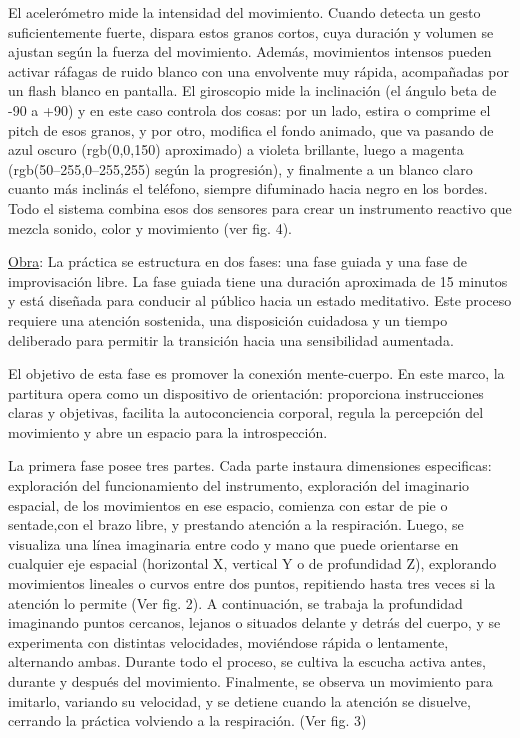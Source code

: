 \documentclass[spanish]{report}
\begin{document}
El acelerómetro mide la intensidad del movimiento. Cuando detecta un gesto suficientemente fuerte, dispara estos granos cortos, cuya duración y volumen se ajustan según la fuerza del movimiento. Además, movimientos intensos pueden activar ráfagas de ruido blanco con una envolvente muy rápida, acompañadas por un flash blanco en pantalla. El giroscopio mide la inclinación (el ángulo beta de -90 a +90) y en este caso controla dos cosas: por un lado, estira o comprime el pitch de esos granos, y por otro, modifica el fondo animado, que va pasando de azul oscuro (rgb(0,0,150) aproximado) a violeta brillante, luego a magenta (rgb(50–255,0–255,255) según la progresión), y finalmente a un blanco claro cuanto más inclinás el teléfono, siempre difuminado hacia negro en los bordes. Todo el sistema combina esos dos sensores para crear un instrumento reactivo que mezcla sonido, color y movimiento (ver fig. 4).

\vspace{1em}
\underline{Obra}:
La práctica se estructura en dos fases: una fase guiada y una fase de improvisación libre. La fase guiada tiene una duración aproximada de 15 minutos y está diseñada para conducir al público hacia un estado meditativo. Este proceso requiere una atención sostenida, una disposición cuidadosa y un tiempo deliberado para permitir la transición hacia una sensibilidad aumentada.

El objetivo de esta fase es promover la conexión mente-cuerpo. En este marco, la partitura opera como un dispositivo de orientación: proporciona instrucciones claras y objetivas, facilita la autoconciencia corporal, regula la percepción del movimiento y abre un espacio para la introspección.

La primera fase posee tres partes. Cada parte instaura dimensiones especificas: exploración del funcionamiento del instrumento, exploración del imaginario espacial, de los movimientos en ese espacio,  comienza con estar de pie o sentade,con el brazo libre, y prestando atención a la respiración. Luego, se visualiza una línea imaginaria entre codo y mano que puede orientarse en cualquier eje espacial (horizontal X, vertical Y o de profundidad Z), explorando movimientos lineales o curvos entre dos puntos, repitiendo hasta tres veces si la atención lo permite (Ver fig. 2). A continuación, se trabaja la profundidad imaginando puntos cercanos, lejanos o situados delante y detrás del cuerpo, y se experimenta con distintas velocidades, moviéndose rápida o lentamente, alternando ambas. Durante todo el proceso, se cultiva la escucha activa antes, durante y después del movimiento. Finalmente, se observa un movimiento para imitarlo, variando su velocidad, y se detiene cuando la atención se disuelve, cerrando la práctica volviendo a la respiración. (Ver fig. 3)
\end{document}

